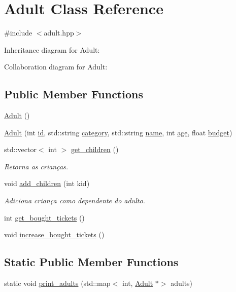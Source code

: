 \hypertarget{class_adult}{}\section{Adult Class Reference}
\label{class_adult}


{\ttfamily \#include $<$adult.\+hpp$>$}



Inheritance diagram for Adult\+:


Collaboration diagram for Adult\+:
\subsection*{Public Member Functions}
\begin{DoxyCompactItemize}
\item 
\hyperlink{class_adult_a0c614efdb50b7bce512eb0ca3ef87208}{Adult} ()
\item 
\hyperlink{class_adult_a327db6418fe4038c1d160e61c6e57d42}{Adult} (int \hyperlink{class_user_aa7e6e39b43020bbe9c3a196b3689b0f7}{id}, std\+::string \hyperlink{class_user_a4216a4a01d8b3b036de85c5238d79cea}{category}, std\+::string \hyperlink{class_user_a085d8d69282b6298964eab8351584536}{name}, int \hyperlink{class_user_aa5829689588d1f982e1a69b73bd68655}{age}, float \hyperlink{class_user_a9c4a23a62f53b4c1c289c27785a5868f}{budget})
\item 
std\+::vector$<$ int $>$ \hyperlink{class_adult_a19e1475bf7f14c3bee931298cdd9b121}{get\+\_\+children} ()
\begin{DoxyCompactList}\small\item\em Retorna as crianças. \end{DoxyCompactList}\item 
void \hyperlink{class_adult_a4fda91eca49bcc0c60d7d60db0e35ba4}{add\+\_\+children} (int kid)
\begin{DoxyCompactList}\small\item\em Adiciona criança como dependente do adulto. \end{DoxyCompactList}\item 
int \hyperlink{class_adult_af30d7f77bbaca033813259e66c630aa9}{get\+\_\+bought\+\_\+tickets} ()
\item 
void \hyperlink{class_adult_a8794550316d53d3fc79875e2001b25e0}{increase\+\_\+bought\+\_\+tickets} ()
\end{DoxyCompactItemize}
\subsection*{Static Public Member Functions}
\begin{DoxyCompactItemize}
\item 
static void \hyperlink{class_adult_aba53ce7a7ecab6b473f0226002da9972}{print\+\_\+adults} (std\+::map$<$ int, \hyperlink{class_adult}{Adult} $\ast$$>$ adults)
\end{DoxyCompactItemize}
